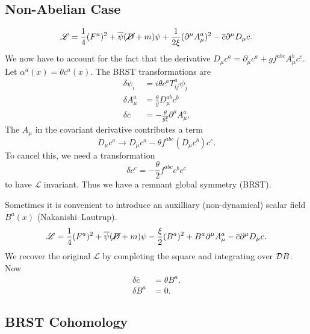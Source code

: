 \subsection{Non-Abelian Case}%
\label{sub:non_abelian_case}

\begin{equation}
  \mathscr{L} = \frac{1}{4} (F^{a})^2 + \overline{\psi}{}(\cancel{D} + m) \psi + \frac{1}{2 \xi} (\partial^{\mu} A_{\mu}^{a})^2 - \overline{c}{} \partial^{\mu} D_{\mu} c.
\end{equation}
We now have to account for the fact that the derivative $D_{\mu} c^{a} = \partial_{\mu} c^{a} + g f^{abc} A_{\mu}^{b} c^{c}$.
Let $\alpha^{a}(x) = \theta c^{a}(x)$. The BRST transformations are
\begin{align}
  \delta \psi_i &= i \theta c^a T^{a}_{ij} \psi_{j} \\
  \delta A_{\mu}^{a} &= \frac{\theta}{g} D_{\mu}^{ab} c^{b} \\
  \delta \overline{c}{} &= -\frac{\theta}{g \xi} \partial^{\mu} A^{a}_{\mu}.
\end{align}
The $A_{\mu}$ in the covariant derivative contributes a term
\begin{equation}
  D_{\mu} c^{a} \to D_{\mu} c^{a} - \theta f^{abc} (D_{\mu} c^{b}) c^{c}.
\end{equation}
To cancel this, we need a transformation
\begin{equation}
  \delta c^{c} = -\frac{\theta}{2} f^{abc} c^{b} c^{c}
\end{equation}
to have $\mathscr{L}$ invariant.
Thus we have a remnant global symmetry (BRST).

Sometimes it is convenient to introduce an auxilliary (non-dynamical) scalar field $B^{a}(x)$ (Nakanishi--Lautrup).
\begin{equation}
  \mathscr{L} = \frac{1}{4} (F^{a})^2 + \overline{\psi}{} (\cancel{D} + m) \psi - \frac{\xi}{2} (B^{a})^2 + B^{a} \partial^{\mu} A^{a}_{\mu} - \overline{c}{} \partial^{\mu} D_{\mu} c.
\end{equation}
We recover the original $\mathscr{L}$ by completing the square and integrating over $\mathop{\mathcal{D} B}$.
Now
\begin{align}
  \delta \overline{c}{} &= \theta B^{a}. \\
  \delta B^{a} &= 0.
\end{align}

\subsection{BRST Cohomology}%
\label{sub:brst_cohomology}


